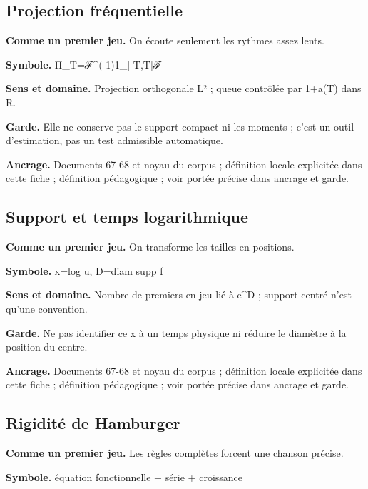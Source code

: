 \documentclass[
  9pt,
  a4paper,
]{article}
\begin{document}
\hypertarget{projection-fruxe9quentielle}{%
\subsection{Projection
fréquentielle}\label{projection-fruxe9quentielle}}

\textbf{Comme un premier jeu.} On écoute seulement les rythmes assez
lents.

\textbf{Symbole.} Π\_T=ℱ\^{}(-1)1\_{[}-T,T{]}ℱ

\textbf{Sens et domaine.} Projection orthogonale L² ; queue contrôlée
par 1+a(T) dans R.

\textbf{Garde.} Elle ne conserve pas le support compact ni les moments ;
c'est un outil d'estimation, pas un test admissible automatique.

\textbf{Ancrage.} Documents 67-68 et noyau du corpus ; définition locale
explicitée dans cette fiche ; définition pédagogique ; voir portée
précise dans ancrage et garde.

\hypertarget{support-et-temps-logarithmique}{%
\subsection{Support et temps
logarithmique}\label{support-et-temps-logarithmique}}

\textbf{Comme un premier jeu.} On transforme les tailles en positions.

\textbf{Symbole.} x=log u, D=diam supp f

\textbf{Sens et domaine.} Nombre de premiers en jeu lié à e\^{}D ;
support centré n'est qu'une convention.

\textbf{Garde.} Ne pas identifier ce x à un temps physique ni réduire le
diamètre à la position du centre.

\textbf{Ancrage.} Documents 67-68 et noyau du corpus ; définition locale
explicitée dans cette fiche ; définition pédagogique ; voir portée
précise dans ancrage et garde.

\hypertarget{rigidituxe9-de-hamburger}{%
\subsection{Rigidité de Hamburger}\label{rigidituxe9-de-hamburger}}

\textbf{Comme un premier jeu.} Les règles complètes forcent une chanson
précise.

\textbf{Symbole.} équation fonctionnelle + série + croissance
\end{document}
